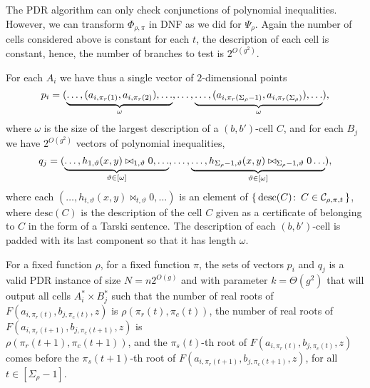 The PDR algorithm can only check conjunctions of polynomial inequalities.
However, we can transform $\Phi_{\rho,\pi}$ in DNF as we did for $\Psi_{\rho}$.
Again the number of cells considered above is constant for each $t$, the
description of each cell is constant, hence, the number of branches to test is
$2^{O(g^2)}$.

For each $A_i$ we have thus a single vector of $2$-dimensional points
\begin{displaymath}
	p_i = (
		\underbrace{%
			\ldots,
			(a_{i,\pi_r(1)},a_{i,\pi_r(2)}),
			\ldots%
		}_{\omega},
		\ldots,
		\underbrace{%
			\ldots,
			(a_{i,\pi_r(\Sigma_\rho-1)},a_{i,\pi_r(\Sigma_\rho)}),
			\ldots%
		}_{\omega}
	),
\end{displaymath}
where $\omega$ is the size of the largest description of a $(b,b')$-cell $C$,
and for each $B_j$ we have $2^{O(g^2)}$ vectors of polynomial inequalities,
\begin{displaymath}
	q_j = (
		\underbrace{%
		\ldots,
		h_{1,\vartheta}(x,y) \bowtie_{1,\vartheta} 0,
		\ldots%
	}_{\vartheta \in [\omega]}
		,\ldots,
		\underbrace{%
		\ldots,
		h_{\Sigma_\rho-1,\vartheta}(x,y) \bowtie_{\Sigma_\rho-1,\vartheta} 0
		\ldots%
	}_{\vartheta \in [\omega]}
	),
\end{displaymath}
where each $(\ldots, h_{t,\vartheta}(x,y) \bowtie_{t,\vartheta} 0, \ldots)$
is an element of
$\{\, \text{desc}(C) \colon\, C \in \mathcal{C}_{\rho,\pi,t}\,\}$,
where $\text{desc}(C)$ is the description of the cell $C$ given as a
certificate of belonging to $C$ in the form of a Tarski sentence.
The description of each $(b,b')$-cell is padded with
its last component so that it has length $\omega$.

For a fixed function $\rho$,
for a fixed function $\pi$,
the sets of vectors $p_i$ and $q_j$ is a valid PDR instance
of size $N = n 2^{O(g)}$ and with parameter $k = \Theta(g^2)$
that will
output all cells $A^*_i \times B^*_j$ such that
the number of real roots of $F(a_{i,\pi_r(t)},b_{j,\pi_c(t)},z)$
is $\rho(\pi_r(t),\pi_c(t))$,
the number of real roots of $F(a_{i,\pi_r(t+1)},b_{j,\pi_c(t+1)},z)$
is \\ $\rho(\pi_r(t+1),\pi_c(t+1))$,
and the $\pi_s(t)$-th root of $F(a_{i,\pi_r(t)},b_{j,\pi_c(t)},z)$
comes before the $\pi_s(t+1)$-th root of
$F(a_{i,\pi_r(t+1)},b_{j,\pi_c(t+1)},z)$,
for all $t \in [\Sigma_\rho-1]$.

